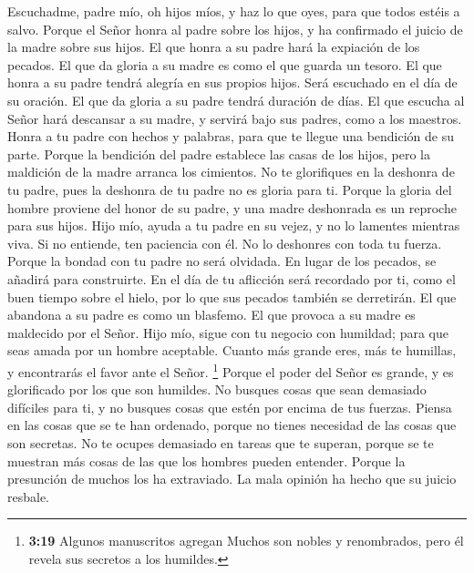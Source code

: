 Escuchadme, padre mío, oh hijos míos, y haz lo que oyes,
para que todos estéis a salvo.  Porque el Señor honra al
padre sobre los hijos, y ha confirmado el juicio de la madre sobre sus
hijos.  El que honra a su padre hará la expiación de los
pecados.  El que da gloria a su madre es como el que
guarda un tesoro.  El que honra a su padre tendrá alegría
en sus propios hijos. Será escuchado en el día de su oración.
 El que da gloria a su padre tendrá duración de días. El
que escucha al Señor hará descansar a su madre,  y servirá
bajo sus padres, como a los maestros.  Honra a tu padre
con hechos y palabras, para que te llegue una bendición de su parte.
 Porque la bendición del padre establece las casas de los
hijos, pero la maldición de la madre arranca los cimientos.
 No te glorifiques en la deshonra de tu padre, pues la
deshonra de tu padre no es gloria para ti.  Porque la
gloria del hombre proviene del honor de su padre, y una madre deshonrada
es un reproche para sus hijos.  Hijo mío, ayuda a tu
padre en su vejez, y no lo lamentes mientras viva.  Si no
entiende, ten paciencia con él. No lo deshonres con toda tu fuerza.
 Porque la bondad con tu padre no será olvidada. En lugar
de los pecados, se añadirá para construirte.  En el día
de tu aflicción será recordado por ti, como el buen tiempo sobre el
hielo, por lo que sus pecados también se derretirán.  El
que abandona a su padre es como un blasfemo. El que provoca a su madre
es maldecido por el Señor.  Hijo mío, sigue con tu
negocio con humildad; para que seas amada por un hombre aceptable.
 Cuanto más grande eres, más te humillas, y encontrarás
el favor ante el Señor.  \footnote{\textbf{3:19} Algunos
  manuscritos agregan Muchos son nobles y renombrados, pero él revela
  sus secretos a los humildes.}  Porque el poder del
Señor es grande, y es glorificado por los que son humildes.
 No busques cosas que sean demasiado difíciles para ti, y
no busques cosas que estén por encima de tus fuerzas. 
Piensa en las cosas que se te han ordenado, porque no tienes necesidad
de las cosas que son secretas.  No te ocupes demasiado en
tareas que te superan, porque se te muestran más cosas de las que los
hombres pueden entender.  Porque la presunción de muchos
los ha extraviado. La mala opinión ha hecho que su juicio resbale.
